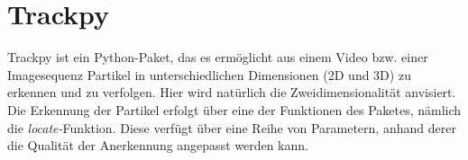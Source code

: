 \section{Trackpy \label{kap1_trackpy}}
Trackpy ist ein Python-Paket, das es ermöglicht aus einem Video bzw. einer Imagesequenz Partikel in unterschiedlichen Dimensionen (2D und 3D) zu erkennen und zu verfolgen. Hier wird natürlich die Zweidimensionalität anvisiert. Die Erkennung der Partikel erfolgt über eine der Funktionen des Paketes, nämlich die \textit{locate-}Funktion.
Diese verfügt über eine Reihe von Parametern, anhand derer die Qualität der Anerkennung angepasst werden kann.

